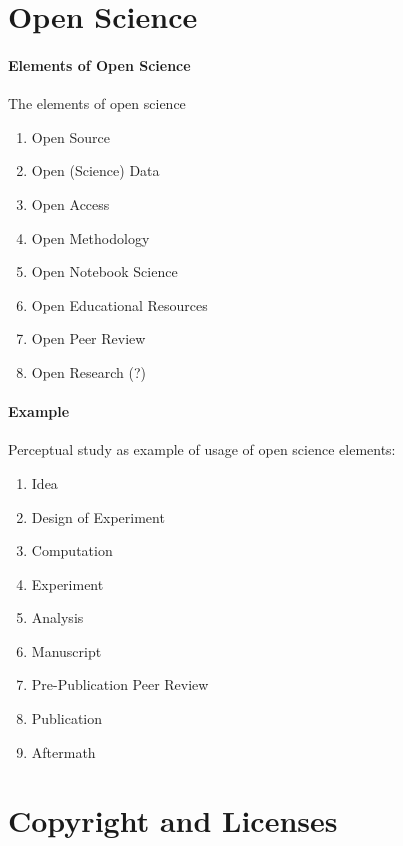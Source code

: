 \documentclass[a4paper, 10pt, twocolumn]{article}
\begin{document}
\section*{Open Science} \label{sec:open_science} 

\paragraph*{Elements of Open Science}

The elements of open science \cite{}
\begin{enumerate}
\item Open Source
\item Open (Science) Data
\item Open Access
\item Open Methodology
\item Open Notebook Science
\item Open Educational Resources
\item Open Peer Review
\item Open Research (?)
\end{enumerate}

\paragraph*{Example}

Perceptual study as example of usage of open science elements:

\begin{enumerate}
\item Idea
\item Design of Experiment
\item Computation
\item Experiment
\item Analysis
\item Manuscript
\item Pre-Publication Peer Review
\item Publication
\item Aftermath
\end{enumerate}

\section*{Copyright and Licenses} \label{sec:copyright}
\end{document}
